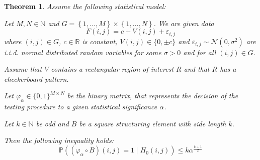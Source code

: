 \documentclass[a4paper,12pt]{article}
\theoremstyle{plain}
\newtheorem{theorem}{Theorem}
\theoremstyle{definition}
\theoremstyle{remark}
\begin{document}
\newpage

\begin{theorem}
	Assume the following statistical model:
	
	Let $M, N \in \mathbb{N}$ and $G = \left\{ 1, \dots, M \right\} \times  \left\{ 1, \dots, N \right\}$. We are given data
	\begin{equation}\label{f}
		F(i, j) = c + V(i, j) + \varepsilon_{i, j}
	\end{equation}
	where $(i, j) \in G$, $c \in \mathbb{R}$ is constant, $V(i, j) \in \{ 0, \pm c \}$ and $\varepsilon_{i, j} \sim \mathcal{N}(0, \sigma^2)$ are i.i.d. normal distributed random variables for some $\sigma > 0$ and for all $(i, j) \in G$.
	
	Assume that $V$ contains a rectangular region of interest $R$ and that $R$ has a checkerboard pattern.
	
	Let $\varphi_\alpha \in \{ 0, 1 \}^{M \times N}$ be the binary matrix, that represents the decision of the testing procedure to a given statistical significance $\alpha$.
	
	Let $k \in \mathbb{N}$ be odd and $B$ be a square structuring element with side length $k$.
	
	Then the following inequality holds:
	\begin{equation*}
		\mathbb{P}((\varphi_\alpha \circ B)(i, j) = 1 \mid H_0(i, j)) \leq k \alpha^{\frac{k+1}{2}}
	\end{equation*}
\end{theorem}
\end{document}
